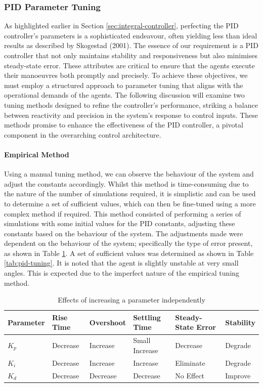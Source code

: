 \documentclass[12pt]{article}
\begin{document}
\subsubsection{PID Parameter Tuning}
\label{sec:pid-tuning}
As highlighted earlier in Section \ref{sec:integral-controller}, perfecting the PID controller's parameters is a sophisticated endeavour, often yielding less than ideal results as described by Skogestad (2001)\cite{skogestad2001probably}. The essence of our requirement is a PID controller that not only maintains stability and responsiveness but also minimises steady-state error. These attributes are critical to ensure that the agents execute their manoeuvres both promptly and precisely. To achieve these objectives, we must employ a structured approach to parameter tuning that aligns with the operational demands of the agents. The following discussion will examine two tuning methods designed to refine the controller's performance, striking a balance between reactivity and precision in the system's response to control inputs. These methods promise to enhance the effectiveness of the PID controller, a pivotal component in the overarching control architecture.

\paragraph{Empirical Method}
Using a manual tuning method, we can observe the behaviour of the system and adjust the constants accordingly. Whilst this method is time-consuming due to the nature of the number of simulations required, it is simplistic and can be used to determine a set of sufficient values, which can then be fine-tuned using a more complex method if required. This method consisted of performing a series of simulations with some initial values for the PID constants, adjusting these constants based on the behaviour of the system. The adjustments made were dependent on the behaviour of the system; specifically the type of error present, as shown in Table \ref{tab:parameter_effects}. A set of sufficient values was determined as shown in Table \ref{tab:pid-tuning}. It is noted that the agent is slightly unstable at very small angles. This is expected due to the imperfect nature of the empirical tuning method. 

\begin{table}[ht]
    \centering
    \begin{tabular}{|l|l|l|l|l|l|}
    \hline
    Parameter & Rise Time  & Overshoot & Settling Time & Steady-State Error & Stability \\ \hline
    \( K_p \) & Decrease    & Increase   & Small Increase  & Decrease           & Degrade   \\ \hline
    \( K_i \) & Decrease    & Increase   & Increase      & Eliminate          & Degrade   \\ \hline
    \( K_d \) & Decrease & Decrease   & Decrease      & No Effect& Improve \\ \hline
    \end{tabular}
    \caption{Effects of increasing a parameter independently\cite{ang2005pid}}
    \label{tab:parameter_effects}
\end{table}
    
\end{document}
